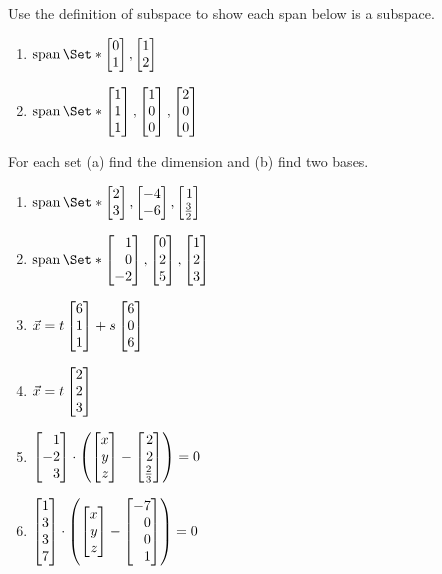 \begin{exercises}
\begin{problist}
		\prob Use the definition of subspace to show each span below is a subspace.
		\begin{enumerate}
			\item $\Span\Set*{\mat{0\\1}, \mat{1\\2}}$
			\item $\Span\Set*{\mat{1\\1\\1}, \mat{1\\0\\0}, \mat{2\\0\\0}}$
		\end{enumerate}

		\prob For each set (a) find the dimension and (b) find two bases.
		\begin{enumerate}
			\item $\Span\Set*{\mat{2\\3}, \mat{-4\\-6}, \mat{1\\\frac{3}{2}}}$
			\item $\Span\Set*{\mat{1\\0\\-2}, \mat{0\\2\\5}, \mat{1\\2\\3}}$
			\item $\vec x = t\mat{6\\1\\1}+s\mat{6\\0\\6}$
			\item $\vec x = t\mat{2\\2\\3}$
			\item $\mat{1\\-2\\3} \cdot \left(\mat{x\\y\\z}-\mat{2\\2\\\frac{2}{3}}\right)=0$
			\item $\mat{1\\3\\3\\7} \cdot \left(\mat{x\\y\\z}-\mat{-7\\0\\0\\1}\right)=0$
		\end{enumerate}


\end{problist}
\end{exercises}
